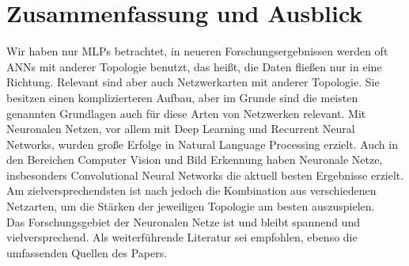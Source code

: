\section{Zusammenfassung und Ausblick}

Wir haben nur MLPs betrachtet, in neueren Forschungsergebnissen werden oft ANNs mit anderer Topologie benutzt, das heißt, die Daten fließen nur in eine Richtung. Relevant sind aber auch Netzwerkarten mit anderer Topologie. Sie besitzen einen komplizierteren Aufbau, aber im Grunde sind die meisten genannten Grundlagen auch für diese Arten von Netzwerken relevant. 
Mit Neuronalen Netzen, vor allem mit Deep Learning und Recurrent Neural Networks, wurden große Erfolge in Natural Language Processing erzielt. Auch in den Bereichen Computer Vision und Bild Erkennung haben Neuronale Netze, insbesonders Convolutional Neural Networks die aktuell besten Ergebnisse erzielt. Am zielversprechendsten ist nach \cite{LeCun2015} jedoch die Kombination aus verschiedenen Netzarten, um die Stärken der jeweiligen Topologie am besten auszuspielen. \\

Das Forschungsgebiet der Neuronalen Netze ist und bleibt spannend und vielversprechend. Als weiterführende Literatur sei \cite{LeCun2015} empfohlen, ebenso die umfassenden Quellen des Papers.


